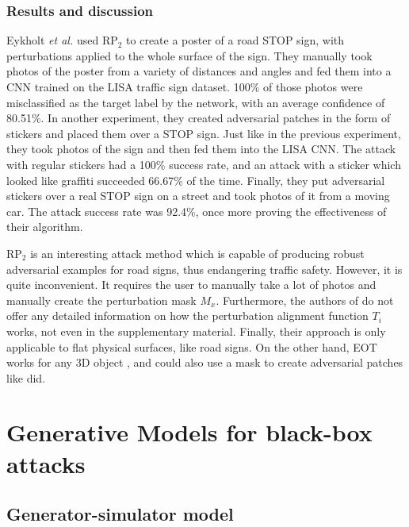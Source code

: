 \subsubsection{Results and discussion}
    \label{subsubsec:rp2_results}

Eykholt \textit{et al.} used $\textrm{RP}_2$ to create a poster of a road STOP sign, with perturbations applied to the whole surface of the sign. They manually took photos of the poster from a variety of distances and angles and fed them into a CNN trained on the LISA traffic sign dataset. 100\% of those photos were misclassified as the target label by the network, with an average confidence of 80.51\%. In another experiment, they created adversarial patches in the form of stickers and placed them over a STOP sign. Just like in the previous experiment, they took photos of the sign and then fed them into the LISA CNN. The attack with regular stickers had a 100\% success rate, and an attack with a sticker which looked like graffiti succeeded 66.67\% of the time. Finally, they put adversarial stickers over a real STOP sign on a street and took photos of it from a moving car. The attack success rate was 92.4\%, once more proving the effectiveness of their algorithm.

$\textrm{RP}_2$ is an interesting attack method which is capable of producing robust adversarial examples for road signs, thus endangering traffic safety. However, it is quite inconvenient. It requires the user to manually take a lot of photos and manually create the perturbation mask $M_x$. Furthermore, the authors of \cite{evtimov_road_signs} do not offer any detailed information on how the perturbation alignment function $T_i$ works, not even in the supplementary material. Finally, their approach is only applicable to flat physical surfaces, like road signs. On the other hand, EOT works for any 3D object \cite{athalye}, and could also use a mask to create adversarial patches like \cite{evtimov_road_signs} did.

\section{Generative Models for black-box attacks}
    \label{sec:generative_models}
    
\subsection{Generator-simulator model}
    \label{subsec:zheng}

